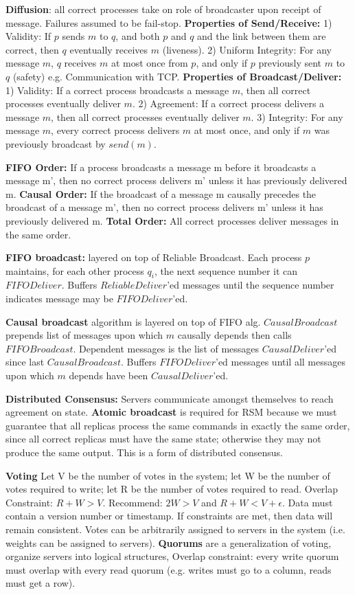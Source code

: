 \documentclass[6pt,landscape]{article}
\begin{document}
\begin{multicols}{3}
{\bf Diffusion}: all correct processes take on role of broadcaster upon receipt of message. Failures assumed to be fail-stop.
{\bf Properties of Send/Receive:}
1) Validity: If $p$ sends $m$ to $q$, and both $p$ and $q$ and the link between them are correct, then $q$ eventually receives $m$ (liveness). 2) Uniform Integrity: For any message $m$, $q$ receives $m$ at most once from $p$, and only if $p$ previously sent $m$ to $q$ (safety) e.g. Communication with TCP.
{\bf Properties of Broadcast/Deliver:}
1) Validity: If a correct process broadcasts a message $m$, then all correct processes eventually deliver $m$. 2) Agreement: If a correct process delivers a message $m$, then all correct processes eventually deliver $m$. 3) Integrity: For any message $m$, every correct process delivers $m$ at most once, and only if $m$ was previously broadcast by $send(m)$.

{\bf FIFO Order:} If a process broadcasts a message m before it broadcasts a message m', then no correct process delivers m' unless it has previously delivered m. 
{\bf Causal Order:} If the broadcast of a message m causally precedes the broadcast of a message m', then no correct process delivers m' unless it has previously delivered m. 
{\bf Total Order:} All correct processes deliver messages in the same order.

{\bf FIFO broadcast:} layered on top of Reliable Broadcast. Each process $p$ maintains, for each other process $q_i$, the next sequence number it can $FIFODeliver$. Buffers $ReliableDeliver$'ed messages until the sequence number indicates message may be $FIFODeliver$'ed.

{\bf Causal broadcast} algorithm is layered on top of FIFO alg. $CausalBroadcast$ prepends list of messages upon which $m$ causally depends then calls $FIFOBroadcast$. Dependent messages is the list of messages $CausalDeliver$'ed since last $CausalBroadcast$. Buffers $FIFODeliver$'ed messages until all messages upon which $m$ depends have been $CausalDeliver$'ed.

{\bf Distributed Consensus:} Servers communicate amongst themselves to reach agreement on state.
{\bf Atomic broadcast} is required for RSM because we must guarantee that all replicas process the same commands in exactly the same order, since all correct replicas must have the same state; otherwise they may not produce the same output. This is a form of distributed consensus.

{\bf Voting} Let V be the number of votes in the system; let W be the number of votes required to write; let R be the number of votes required to read. Overlap Constraint: $R + W > V$. Recommend: $2W > V$ and $R + W < V + \epsilon$. Data must contain a version number or timestamp. If constraints are met, then data will remain consistent. Votes can be arbitrarily assigned to servers in
the system (i.e. weights can be assigned to servers).
{\bf Quorums} are a generalization of voting, organize servers into logical structures, Overlap constraint: every write quorum must overlap with every read quorum (e.g. writes must go to a column, reads must get a row).


\end{multicols}
\end{document}
